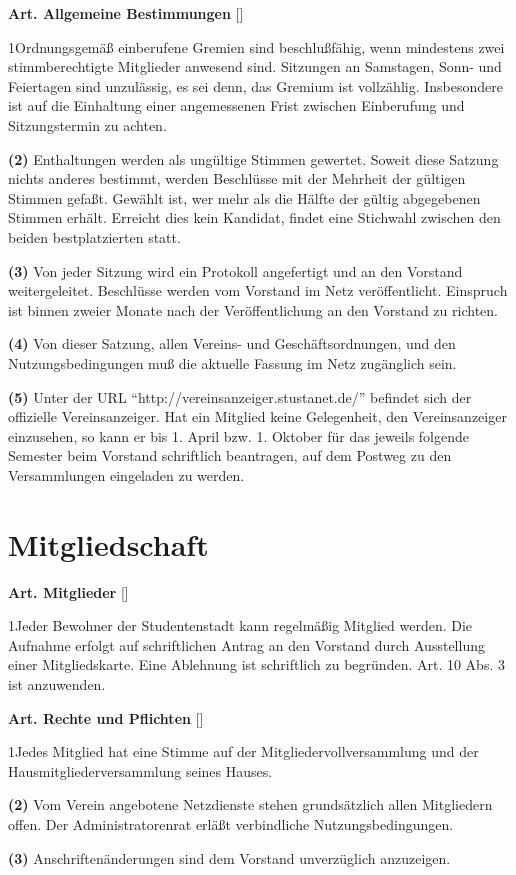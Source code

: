 \documentclass[12pt]{article}
\newcommand{\Abschnitt}[1]{\section{#1}}
\newcommand{\Satz}[2]{

\begin{samepage}
{\bf (#1)} #2
\end{samepage}
}
\newenvironment{Artikel}[2]{
\bigskip \centerline{{\bf Art. #1} [#2]}
\nopagebreak
}{
}
\begin{document}
\begin{Artikel}{5}{Allgemeine Bestimmungen}

\Satz{1}{Ordnungsgemäß einberufene Gremien sind beschlußfähig, wenn mindestens
zwei stimmberechtigte Mitglieder anwesend sind. Sitzungen an Samstagen, Sonn-
und Feiertagen sind unzulässig, es sei denn, das Gremium ist vollzählig.
Insbesondere ist auf die Einhaltung einer angemessenen Frist zwischen
Einberufung und Sitzungstermin zu achten.}

\Satz{2}{Enthaltungen werden als ungültige Stimmen gewertet. Soweit diese
Satzung nichts anderes bestimmt, werden Beschlüsse mit der Mehrheit der
gültigen Stimmen gefaßt. Gewählt ist, wer mehr als die Hälfte der gültig
abgegebenen Stimmen erhält. Erreicht dies kein Kandidat, findet eine Stichwahl
zwischen den beiden bestplatzierten statt.}

\Satz{3}{Von jeder Sitzung wird ein Protokoll angefertigt und an den Vorstand
weitergeleitet. Beschlüsse werden vom Vorstand im Netz veröffentlicht.
Einspruch ist binnen zweier Monate nach der Veröffentlichung an den Vorstand zu
richten.}

\Satz{4}{Von dieser Satzung, allen Vereins- und Geschäftsordnungen, und den
Nutzungsbedingungen muß die aktuelle Fassung im Netz zugänglich sein.}

\Satz{5}{Unter der URL "`http://vereinsanzeiger.stustanet.de/"' befindet sich
der offizielle Vereinsanzeiger. Hat ein Mitglied
keine Gelegenheit, den Vereinsanzeiger einzusehen, so kann er bis 1. April bzw.
1. Oktober für das jeweils folgende Semester beim Vorstand schriftlich
beantragen, auf dem Postweg zu den Versammlungen eingeladen zu werden.}

\end{Artikel}

\Abschnitt{Mitgliedschaft}

\begin{Artikel}{6}{Mitglieder}

\Satz{1}{Jeder Bewohner der Studentenstadt kann regelmäßig Mitglied werden. 
Die Aufnahme erfolgt auf schriftlichen Antrag an den Vorstand durch Ausstellung
einer Mitgliedskarte. Eine Ablehnung ist schriftlich zu begründen.  Art. 10
Abs. 3 ist anzuwenden.}

\end{Artikel}

\begin{Artikel}{7}{Rechte und Pflichten}

\Satz{1}{Jedes Mitglied hat eine Stimme auf der Mitgliedervollversammlung und
der Hausmitgliederversammlung seines Hauses.}

\Satz{2}{Vom Verein angebotene Netzdienste stehen grundsätzlich allen
Mitgliedern offen. Der Administratorenrat erläßt verbindliche
Nutzungsbedingungen.}

\Satz{3}{Anschriftenänderungen sind dem Vorstand unverzüglich anzuzeigen.}

\end{Artikel}
\end{document}
